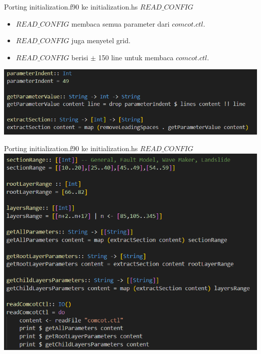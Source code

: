 \documentclass{beamer}
\begin{document}
\begin{frame}{Porting initialization.f90 ke initialization.hs}
    $READ\_CONFIG$
    \begin{itemize}
        \item $READ\_CONFIG$ membaca semua parameter dari $comcot.ctl$.
        \item $READ\_CONFIG$ juga menyetel grid.
        \item $READ\_CONFIG$ berisi $\pm$ 150 line untuk membaca $comcot.ctl$.
    \end{itemize}
    \includegraphics[scale=0.5]{figure/read_config_2.png}
        
\end{frame}

\begin{frame}{Porting initialization.f90 ke initialization.hs}
    $READ\_CONFIG$
    \includegraphics[scale=0.5]{figure/read_config_1.png}
\end{frame}
\end{document}
